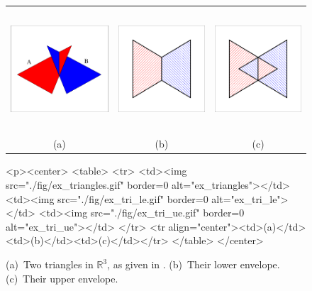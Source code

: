 \begin{figure}[t]
\begin{ccTexOnly}
  \begin{center}
  \begin{tabular}{ccc}
    \includegraphics[height=1.8in]{Envelope_3/fig/ex_triangles} &
    \includegraphics[height=1.8in]{Envelope_3/fig/ex_tri_le} &
    \includegraphics[height=1.8in]{Envelope_3/fig/ex_tri_ue} \\
    {\small (a)} & {\small (b)} & {\small (c)}
  \end{tabular}
  \end{center}
\end{ccTexOnly}
\begin{ccHtmlOnly}
  <p><center>
  <table>
  <tr>
  <td><img src="./fig/ex_triangles.gif" border=0 alt="ex_triangles"></td>
  <td><img src="./fig/ex_tri_le.gif" border=0 alt="ex_tri_le"></td>
  <td><img src="./fig/ex_tri_ue.gif" border=0 alt="ex_tri_ue"></td>
  </tr>
  <tr align="center"><td>(a)</td><td>(b)</td><td>(c)</td></tr>
  </table>
  </center>
\end{ccHtmlOnly}
\caption{(a)~Two triangles in ${\mathbb R}^3$, as given in
. (b)~Their lower envelope.
(c)~Their upper envelope.\label{env3_fig:ex_tri}}
\end{figure}

